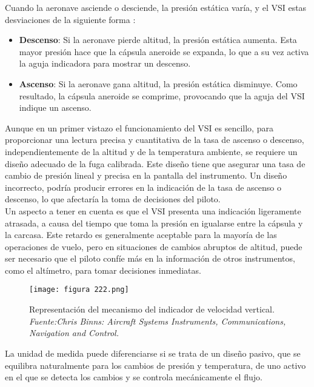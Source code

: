 Cuando la aeronave asciende o desciende, la presión estática varía, y el VSI estas desviaciones de la siguiente forma :\\

\begin{itemize}
    \item \textbf{Descenso}: Si la aeronave pierde altitud, la presión estática aumenta. Esta mayor presión hace que la cápsula aneroide se expanda, lo que a su vez activa la aguja indicadora para mostrar un descenso.
    
    \item \textbf{Ascenso}: Si la aeronave gana altitud, la presión estática disminuye. Como resultado, la cápsula aneroide se comprime, provocando que la aguja del VSI indique un ascenso.\\
\end{itemize}

Aunque en un primer vistazo el funcionamiento del VSI es sencillo, para proporcionar una lectura precisa y cuantitativa de la tasa de ascenso o descenso, independientemente de la altitud y de la temperatura ambiente, se requiere un diseño adecuado de la fuga calibrada. Este diseño tiene que asegurar una tasa de cambio de presión lineal y precisa en la pantalla del instrumento. Un diseño incorrecto, podría producir errores en la indicación de la tasa de ascenso o descenso, lo que afectaría la toma de decisiones del piloto.\\

Un aspecto a tener en cuenta es que el VSI presenta una indicación ligeramente atrasada, a causa del tiempo que toma la presión en igualarse entre la cápsula y la carcasa. Este retardo es generalmente aceptable para la mayoría de las operaciones de vuelo, pero en situaciones de cambios abruptos de altitud, puede ser necesario que el piloto confíe más en la información de otros instrumentos, como el altímetro, para tomar decisiones inmediatas.

\begin{figure}[H]
    \centering
    \texttt{[image: figura 222.png]}
    \caption{\centering Representación del mecanismo del indicador de velocidad vertical. \textit{Fuente:Chris Binns: Aircraft Systems Instruments, Communications, Navigation and Control.}}
    \label{fig:placeholdeeeeeeer}
\end{figure}

La unidad de medida puede diferenciarse si se trata de un diseño pasivo, que se equilibra naturalmente para los cambios de presión y temperatura, de uno activo en el que se detecta los cambios y se controla mecánicamente el flujo.

